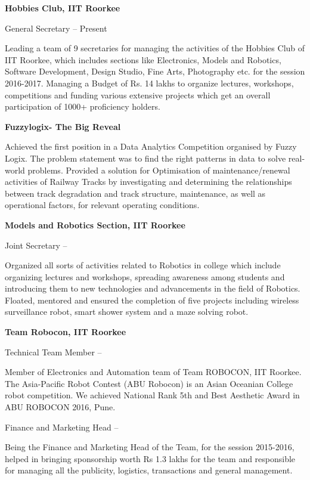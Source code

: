\documentclass[a4paper,10pt,oneside]{article}
\begin{document}
\begin{body}
{{\textbf{Hobbies Club, IIT Roorkee}}
\par 
General Secretary
\hfill
{} --
Present
\begin{detail}
\BulletItem
Leading a team of 9 secretaries for managing the activities of the Hobbies Club of IIT Roorkee, which includes sections
like Electronics, Models and Robotics, Software Development, Design Studio, Fine Arts, Photography etc. for the session
2016-2017.
\BulletItem
Managing a Budget of Rs. 14 lakhs to organize lectures, workshops, competitions and funding various extensive projects
which get an overall participation of 1000+ proficiency holders.

\end{detail}

\EntryGap
{\textbf{Fuzzylogix- The Big Reveal }}
\hfill
{}
\begin{detail}
\BulletItem
Achieved the first position in a Data Analytics Competition organised by Fuzzy Logix.
\BulletItem
The problem statement was to find the right patterns in data to solve real-world problems.
\BulletItem
Provided a solution for Optimisation of maintenance/renewal activities of Railway Tracks by investigating and determining
the relationships between track degradation and track structure, maintenance, as well as operational factors, for relevant
operating conditions.
\end{detail}

\EntryGap

{\textbf{Models and Robotics Section, IIT Roorkee }}
\par
Joint Secretary
\hfill
{} --
\begin{detail}
\BulletItem
Organized all sorts of activities related to Robotics in college which include organizing lectures and workshops, spreading
awareness among students and introducing them to new technologies and advancements in the field of Robotics.
\BulletItem
Floated, mentored and ensured the completion of five projects including wireless surveillance robot, smart shower system
and a maze solving robot. 
\end{detail}

\EntryGap

{\textbf{Team Robocon, IIT Roorkee }}
\par
Technical Team Member
\hfill
{} --
\begin{detail}
\BulletItem
Member of Electronics and Automation team of Team ROBOCON, IIT Roorkee. The Asia-Pacific Robot Contest (ABU
Robocon) is an Asian Oceanian College robot competition.
\BulletItem
We achieved National Rank 5th and Best Aesthetic Award in ABU ROBOCON 2016, Pune.
\end{detail}
\SmallEntryGap
Finance and Marketing Head
\hfill
{} --
\begin{detail}
\BulletItem
Being the Finance and Marketing Head of the Team, for the session 2015-2016, helped in bringing sponsorship worth Rs
1.3 lakhs for the team and responsible for managing all the publicity, logistics, transactions and general management.


\end{detail}}
\end{body}
\end{document}
